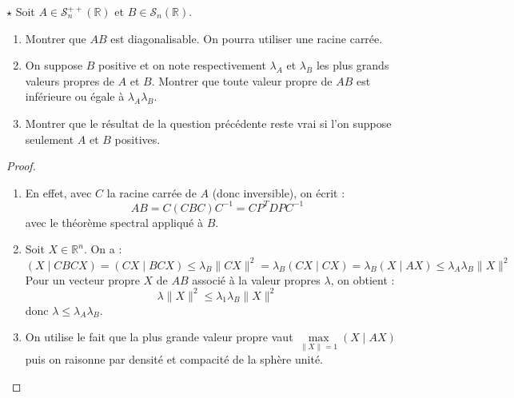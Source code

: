 \documentclass[french,a4paper]{article}
\newcommand{\R}{\mathbb{R}}
\newcommand{\inv}{^{-1}}
\theoremstyle{plain}
\theoremstyle{definition}
\theoremstyle{remark}
\begin{document}
\begin{ex}{$\star$}
	Soit $A\in\mathcal{S}_n^{++}(\R)$ et $B\in\mathcal{S}_n(\R)$.
	\begin{enumerate}
		\item Montrer que $AB$ est diagonalisable. On pourra utiliser une racine carrée.
		\item On suppose $B$ positive et on note respectivement $\lambda_A$ et $\lambda_B$ les plus grands valeurs propres de $A$ et $B$. Montrer que toute valeur propre de $AB$ est inférieure ou égale à $\lambda_A\lambda_B$.
		\item Montrer que le résultat de la question précédente reste vrai si l'on suppose seulement $A$ et $B$ positives. 
	\end{enumerate}
\end{ex}
\begin{proof}
	\begin{enumerate}
		\item En effet, avec $C$ la racine carrée de $A$ (donc inversible), on écrit : $$AB=C(CBC)C\inv=CP^T DPC\inv$$ avec le théorème spectral appliqué à $B$.
		\item Soit $X\in\R^n$. On a : $$(X\mid CBCX)=(CX\mid BCX)\leqslant\lambda_B\lVert CX\rVert^2=\lambda_B(CX\mid CX)=\lambda_B(X\mid AX)\leqslant \lambda_A\lambda_B\lVert X\rVert^2$$ Pour un vecteur propre $X$ de $AB$ associé à la valeur propres $\lambda$, on obtient : $$\lambda\lVert X\rVert^2\leqslant\lambda_1\lambda_B\lVert X\rVert^2$$ donc $\lambda\leqslant\lambda_A\lambda_B$.
		\item On utilise le fait que la plus grande valeur propre vaut $\displaystyle\underset{\lVert X\rVert=1}{\max}(X\mid AX)$ puis on raisonne par densité et compacité de la sphère unité.
	\end{enumerate}
\end{proof}
\end{document}
